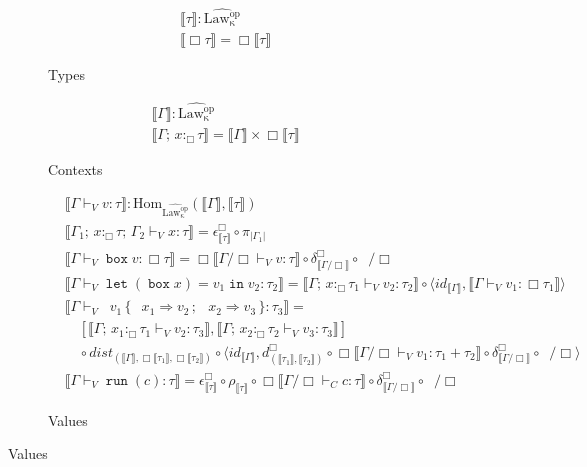 \documentclass[acmsmall, screen, review, anonymous]{acmart}
\theoremstyle{definition}
\newcommand{\glob}{\mathop{\Box}}
\newcommand{\lawcop}{\mathrm{Law_{\kappa}^{op}}}
\newcommand{\pshlawcop}{\widehat{\lawcop}}
\newcommand{\homset}[3]{\mathrm{Hom}_{#1}(#2, #3)}
\newcommand{\sem}[1]{\llbracket #1 \rrbracket}
\newcommand{\counit}[1]{\epsilon^{#1}}
\newcommand{\comult}[1]{\delta^{#1}}
\newcommand{\ununit}{\rho}
\newcommand{\seq}{\,;\,}
\newcommand{\proj}[1]{\pi_{#1}}
\newcommand{\inlname}{\mathop{\mathtt{in}_L}}
\newcommand{\inl}[1]{\inlname #1}
\newcommand{\inrname}{\mathop{\mathtt{in}_R}}
\newcommand{\inr}[1]{\inrname #1}
\newcommand{\copair}[2]{[#1, #2]}
\newcommand{\distc}[3]{\mathit{dist}_{(#1, #2, #3)}}
\newcommand{\gdist}[2]{d^{\Box}_{(#1, #2)}}
\newcommand{\casename}{\mathtt{case}}
\newcommand{\caseboxname}{\casename^{\Box}}
\newcommand{\casebox}[5]{\mathop{\caseboxname} #1 \,\{\,\inl{#2} \Rightarrow #3 \seq \inr{#4} \Rightarrow #5 \,\}}
\newcommand{\types}{\mathrel{:}}
\newcommand{\gtypes}{\mathrel{:_{\Box}}}
\newcommand{\ccons}[2]{#1;\,#2}
\newcommand{\gbind}[3]{\ccons{#1}{#2\gtypes#3}}
\newcommand{\cdiv}[1]{#1/\Box}
\newcommand{\bdiv}[1]{\cdiv{\mathop{!_{#1}}}}
\newcommand{\gboxname}{\mathop{\mathtt{box}}}
\newcommand{\gbox}[1]{\gboxname #1}
\newcommand{\gunbox}[3]{\mathop{\mathtt{let}} (\gbox{#1}) = #2 \mathop{\mathtt{in}} #3}
\newcommand{\grunname}{\mathtt{run}}
\newcommand{\grun}[1]{\mathop{\grunname}(#1)}
\newcommand{\turnv}{\mathrel{\vdash_V}}
\newcommand{\turnc}{\mathrel{\vdash_C}}
\begin{document}
\begin{figure}
\begin{subfigure}[t]{0.45\textwidth}
\begin{align*}
&\sem{\tau} \mathrel{:} \pshlawcop \\
&\sem{\glob \tau} = \glob \sem{\tau}
\end{align*}
\caption{Types}
\end{subfigure}
\hfill
\begin{subfigure}[t]{0.45\textwidth}
\begin{align*}
&\sem{\Gamma} \mathrel{:} \pshlawcop \\
&\sem{\gbind{\Gamma}{x}{\tau}} = \sem{\Gamma} \times \glob \sem{\tau}
\end{align*}
\caption{Contexts}
\end{subfigure}

\begin{subfigure}{\textwidth}
\begin{align*}
&\sem{\Gamma \turnv v \types \tau} \mathrel{:} \homset{\pshlawcop}{\sem{\Gamma}}{\sem{\tau}} \\
&\sem{\ccons{\gbind{\Gamma_1}{x}{\tau}}{\Gamma_2} \turnv x \types \tau} = \counit{\glob}_{\sem{\tau}} \circ \proj{|\Gamma_1|} \\
&\sem{\Gamma \turnv \gbox{v} \types \glob \tau} =
  \glob \sem{\cdiv{\Gamma} \turnv v \types \tau}
  \circ \comult{\glob}_{\sem{\cdiv{\Gamma}}} \circ \bdiv{\Gamma} \\
&\sem{\Gamma \turnv \gunbox{x}{v_1}{v_2} \types \tau_2} =
  \sem{\gbind{\Gamma}{x}{\tau_1} \turnv v_2 \types \tau_2}
  \circ \langle id_{\sem{\Gamma}},
                \sem{\Gamma \turnv v_1 \types \glob \tau_1} \rangle \\
&\sem{\Gamma \turnv \casebox{v_1}{x_1}{v_2}{x_2}{v_3} \types \tau_3} = {} \\
&\quad \copair{\sem{\gbind{\Gamma}{x_1}{\tau_1} \turnv v_2 \types \tau_3}}
         {\sem{\gbind{\Gamma}{x_2}{\tau_2} \turnv v_3 \types \tau_3}} \\
&\quad \circ \distc{\sem{\Gamma}}{\glob \sem{\tau_1}}{\glob \sem{\tau_2}}
   \circ \langle id_{\sem{\Gamma}},
      \gdist{\sem{\tau_1}}{\sem{\tau_2}}
      \circ \glob \sem{\cdiv{\Gamma} \turnv v_1 \types \tau_1 + \tau_2}
      \circ \comult{\glob}_{\sem{\cdiv{\Gamma}}} \circ \bdiv{\Gamma} \rangle \\
&\sem{\Gamma \turnv \grun{c} \types \tau} =
  \counit{\glob}_{\sem{\tau}} \circ \ununit_{\sem{\tau}}
  \circ \glob \sem{\cdiv{\Gamma} \turnc c \types \tau}
  \circ \comult{\glob}_{\sem{\cdiv{\Gamma}}} \circ \bdiv{\Gamma}
\end{align*}
\caption{Values}
\end{subfigure}


\end{figure}
\end{document}
